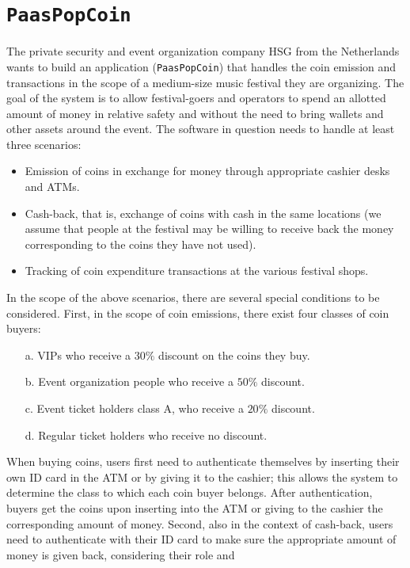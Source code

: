 \section{\texttt{PaasPopCoin}}

The private security and event organization company HSG from the Netherlands wants to build an application (\texttt{PaasPopCoin}) that handles the coin emission and transactions in 
the scope of a medium-size music festival they are organizing. The goal of the system is to allow festival-goers and operators to spend an allotted amount of money in 
relative safety and without the need to bring wallets and other assets around the event. The software in question needs to handle at least three scenarios:
\begin{itemize}
    \item Emission of coins in exchange for money through appropriate cashier desks and ATMs.
    \item Cash-back, that is, exchange of coins with cash in the same locations (we assume that people at the festival may be willing to receive back the money corresponding
        to the coins they have not used).
    \item Tracking of coin expenditure transactions at the various festival shops.
\end{itemize}
In the scope of the above scenarios, there are several special conditions to be considered. First, in the scope of coin emissions, there exist four classes of coin buyers: 
\begin{itemize}
    \item [a.] VIPs who receive a $30\%$ discount on the coins they buy. 
    \item [b.] Event organization people who receive a $50\%$ discount. 
    \item [c.] Event ticket holders class A, who receive a $20\%$ discount. 
    \item [d.] Regular ticket holders who receive no discount.
\end{itemize}
When buying coins, users first need to authenticate themselves by inserting their own ID card in the ATM or by giving it to the cashier; this allows the system to determine 
the class to which each coin buyer belongs. After authentication, buyers get the coins upon inserting into the ATM or giving to the cashier the corresponding amount of money.
Second, also in the context of cash-back, users need to authenticate with their ID card to make sure the appropriate amount of money is given back, considering their role and 

